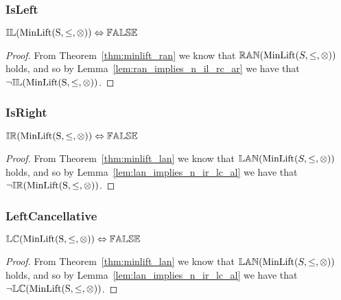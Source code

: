 \documentclass[../Summary.tex]{subfiles}
\begin{document}
\subsubsection{IsLeft}

\begin{theorem} \label{thm:minlift_il}
${\mathbb{IL}}(\mathrm{MinLift(S,\leq,\otimes)}) \Leftrightarrow {\mathbb{FALSE}}$
\end{theorem}

\begin{proof}

\vspace{0.5em}
From Theorem~\ref{thm:minlift_ran} we know that ${\mathbb{RAN}}(\mathrm{MinLift}(S,\leq,\otimes))$ holds, and so by Lemma~\ref{lem:ran_implies_n_il_rc_ar} we have that $\neg {\mathbb{IL}}(\mathrm{MinLift(S,\leq,\otimes)})$.
\end{proof}





\subsubsection{IsRight}

\begin{theorem} \label{thm:minlift_ir}
${\mathbb{IR}}(\mathrm{MinLift(S,\leq,\otimes)}) \Leftrightarrow {\mathbb{FALSE}}$
\end{theorem}

\begin{proof}

\vspace{0.5em}
From Theorem~\ref{thm:minlift_lan} we know that ${\mathbb{LAN}}(\mathrm{MinLift}(S,\leq,\otimes))$ holds, and so by Lemma~\ref{lem:lan_implies_n_ir_lc_al} we have that $\neg {\mathbb{IR}}(\mathrm{MinLift(S,\leq,\otimes)})$.
\end{proof}





\subsubsection{LeftCancellative}

\begin{theorem} \label{thm:minlift_lc}
${\mathbb{LC}}(\mathrm{MinLift(S,\leq,\otimes)}) \Leftrightarrow {\mathbb{FALSE}}$
\end{theorem}

\begin{proof}

\vspace{0.5em}
From Theorem~\ref{thm:minlift_lan} we know that ${\mathbb{LAN}}(\mathrm{MinLift}(S,\leq,\otimes))$ holds, and so by Lemma~\ref{lem:lan_implies_n_ir_lc_al} we have that $\neg {\mathbb{LC}}(\mathrm{MinLift(S,\leq,\otimes)})$.
\end{proof}
\end{document}
